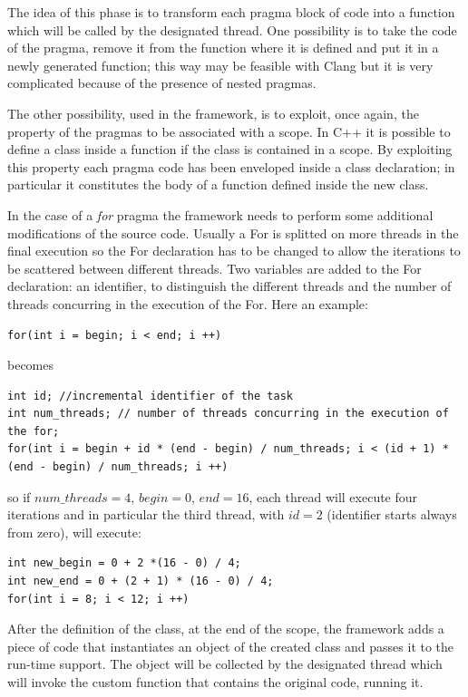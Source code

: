 \documentclass[a4paper,12pt,oneside]{book}
\begin{document}
The idea of this phase is to transform each pragma block of code into a function which will be called by the designated thread. One possibility is to take the code of the pragma, remove it from the function where it is defined and put it in a newly generated function; this way may be feasible with Clang but it is very complicated because of the presence of nested pragmas. 

The other possibility, used in the framework, is to exploit, once again, the property of the pragmas to be associated with a scope. In C++ it is possible to define a class inside a function if the class is contained in a scope. By exploiting this property each pragma code has been enveloped inside a class declaration; in particular it constitutes the body of a function defined inside the new class.

In the case of a \emph{for} pragma the framework needs to perform some additional modifications of the source code. Usually a For is splitted on more threads in the final execution so the For declaration has to be changed to allow the iterations to be scattered between different threads. Two variables are added to the For declaration: an identifier, to distinguish the different threads and the number of threads concurring in the execution of the For. Here an example:

\begin{lstlisting}[language=CCC]
for(int i = begin; i < end; i ++)
\end{lstlisting}
becomes

\begin{lstlisting}[language=CCC]
int id; //incremental identifier of the task
int num_threads; // number of threads concurring in the execution of the for;
for(int i = begin + id * (end - begin) / num_threads; i < (id + 1) * (end - begin) / num_threads; i ++)
\end{lstlisting}
so if $num\_threads  = 4$, $begin = 0$, $end = 16$, each thread will execute four iterations and in particular the third thread, with $id = 2$ (identifier starts always from zero), will execute:
\begin{lstlisting}[language=CCC]
int new_begin = 0 + 2 *(16 - 0) / 4;
int new_end = 0 + (2 + 1) * (16 - 0) / 4;
for(int i = 8; i < 12; i ++)
\end{lstlisting}

After the definition of the class, at the end of the scope, the framework adds a piece of code that instantiates an object of the created class and passes it to the run-time support. The object will be collected by the designated thread which will invoke the custom function that contains the original code, running it. 
\end{document}
